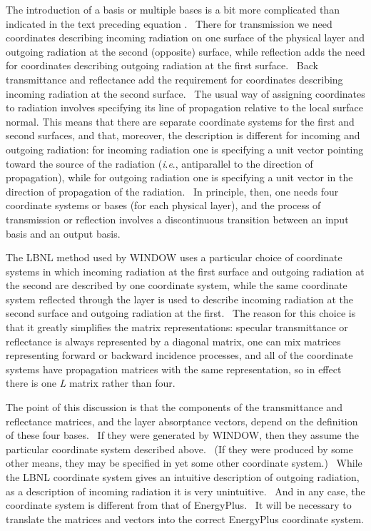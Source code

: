 The introduction of a basis or multiple bases is a bit more complicated than indicated in the text preceding equation .~ There for transmission we need coordinates describing incoming radiation on one surface of the physical layer and outgoing radiation at the second (opposite) surface, while reflection adds the need for coordinates describing outgoing radiation at the first surface.~ Back transmittance and reflectance add the requirement for coordinates describing incoming radiation at the second surface.~ The usual way of assigning coordinates to radiation involves specifying its line of propagation relative to the local surface normal. This means that there are separate coordinate systems for the first and second surfaces, and that, moreover, the description is different for incoming and outgoing radiation: for incoming radiation one is specifying a unit vector pointing toward the source of the radiation (\emph{i}.\emph{e}., antiparallel to the direction of propagation), while for outgoing radiation one is specifying a unit vector in the direction of propagation of the radiation.~ In principle, then, one needs four coordinate systems or bases (for each physical layer), and the process of transmission or reflection involves a discontinuous transition between an input basis and an output basis.

The LBNL method used by WINDOW uses a particular choice of coordinate systems in which incoming radiation at the first surface and outgoing radiation at the second are described by one coordinate system, while the same coordinate system reflected through the layer is used to describe incoming radiation at the second surface and outgoing radiation at the first.~ The reason for this choice is that it greatly simplifies the matrix representations: specular transmittance or reflectance is always represented by a diagonal matrix, one can mix matrices representing forward or backward incidence processes, and all of the coordinate systems have propagation matrices with the same representation, so in effect there is one \emph{L} matrix rather than four.

The point of this discussion is that the components of the transmittance and reflectance matrices, and the layer absorptance vectors, depend on the definition of these four bases.~ If they were generated by WINDOW, then they assume the particular coordinate system described above.~ (If they were produced by some other means, they may be specified in yet some other coordinate system.)~ While the LBNL coordinate system gives an intuitive description of outgoing radiation, as a description of incoming radiation it is very unintuitive.~ And in any case, the coordinate system is different from that of EnergyPlus.~ It will be necessary to translate the matrices and vectors into the correct EnergyPlus coordinate system.

